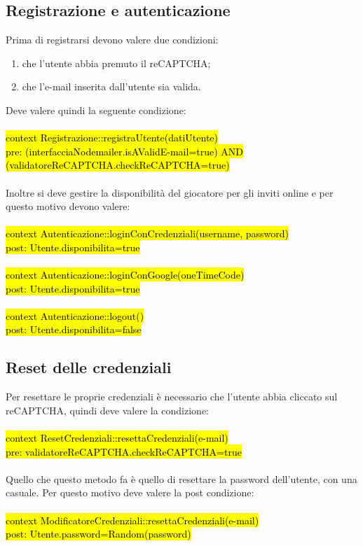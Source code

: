 \subsection{Registrazione e autenticazione}
Prima di registrarsi devono valere due condizioni:
\begin{enumerate}
    \item che l'utente abbia premuto il reCAPTCHA;
    \item che l'e-mail inserita dall'utente sia valida.
\end{enumerate}
\noindent
Deve valere quindi la seguente condizione: \\
\\
\hl{context Registrazione::registraUtente(datiUtente) \\
pre: (interfacciaNodemailer.isAValidE-mail=true) AND \\ 
(validatoreReCAPTCHA.checkReCAPTCHA=true) \\}
\\
Inoltre si deve gestire la disponibilità del giocatore per gli inviti online e per questo motivo devono valere: \\
\\
\hl{context Autenticazione::loginConCredenziali(username, password) \\
post: Utente.disponibilita=true} \\
\\
\hl{context Autenticazione::loginConGoogle(oneTimeCode) \\
post: Utente.disponibilita=true} \\
\\
\hl{context Autenticazione::logout() \\
post: Utente.disponibilita=false}

\subsection{Reset delle credenziali}
Per resettare le proprie credenziali è necessario che l'utente abbia cliccato sul reCAPTCHA, quindi deve valere la condizione: \\
\\
\hl{context ResetCredenziali::resettaCredenziali(e-mail) \\
pre: validatoreReCAPTCHA.checkReCAPTCHA=true} \\
\\
Quello che questo metodo fa è quello di resettare la password dell'utente, con una casuale. Per questo motivo deve valere la post condizione: \\
\\
\hl{context ModificatoreCredenziali::resettaCredenziali(e-mail) \\
post: Utente.password=Random(password)}

